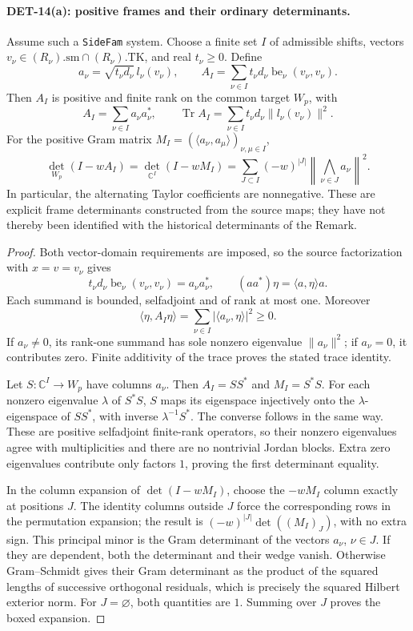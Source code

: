 \documentclass[11pt,a4paper]{article}
\newcommand{\Tr}{\operatorname{Tr}}
\begin{document}
\paragraph{DET-14(a): positive frames and their ordinary determinants.}
Assume such a \texttt{SideFam} system. Choose a finite set \(I\) of
admissible shifts, vectors
\(v_\nu\in(R_\nu).\mathrm{sm}\cap(R_\nu).\mathrm{TK}\), and
real \(t_\nu\ge0\). Define
\[
 a_\nu=\sqrt{t_\nu d_\nu}\,l_\nu(v_\nu),\qquad
 A_I=\sum_{\nu\in I}t_\nu d_\nu
                \operatorname{be}_\nu(v_\nu,v_\nu).
\]
Then \(A_I\) is positive and finite rank on the common target \(W_p\),
with
\[
 A_I=\sum_{\nu\in I}a_\nu a_\nu^*,\qquad
 \Tr A_I=\sum_{\nu\in I}t_\nu d_\nu\|l_\nu(v_\nu)\|^2.
\]
For the positive Gram matrix
\(M_I=(\langle a_\nu,a_\mu\rangle)_{\nu,\mu\in I}\),
\[
 \boxed{\quad
 \det_{W_p}(I-wA_I)=\det_{\mathbb C^I}(I-wM_I)
 =\sum_{J\subset I}(-w)^{|J|}
       \left\|\bigwedge_{\nu\in J}a_\nu\right\|^2.\quad}
\]
In particular, the alternating Taylor coefficients are nonnegative.
These are explicit frame determinants constructed from the source
maps; they have not thereby been identified with the historical
determinants of the Remark.
\begin{proof}
Both vector-domain requirements are imposed, so the source
factorization with \(x=v=v_\nu\) gives
\[
 t_\nu d_\nu\operatorname{be}_\nu(v_\nu,v_\nu)
 =a_\nu a_\nu^*,\qquad
 (aa^*)\eta=\langle a,\eta\rangle a.
\]
Each summand is bounded, selfadjoint and of rank at most one.
Moreover
\[
 \langle\eta,A_I\eta\rangle
 =\sum_{\nu\in I}|\langle a_\nu,\eta\rangle|^2\ge0.
\]
If \(a_\nu\ne0\), its rank-one summand has sole nonzero eigenvalue
\(\|a_\nu\|^2\); if \(a_\nu=0\), it contributes zero. Finite
additivity of the trace proves the stated trace identity.

Let \(S:\mathbb C^I\to W_p\) have columns \(a_\nu\).
Then \(A_I=SS^*\) and \(M_I=S^*S\).
For each nonzero eigenvalue \(\lambda\) of \(S^*S\), \(S\) maps its
eigenspace injectively onto the \(\lambda\)-eigenspace of \(SS^*\),
with inverse \(\lambda^{-1}S^*\). The converse follows in the
same way. These are positive selfadjoint finite-rank operators,
so their nonzero eigenvalues agree with multiplicities and there
are no nontrivial Jordan blocks. Extra zero eigenvalues contribute
only factors \(1\), proving the first determinant equality.

In the column expansion of \(\det(I-wM_I)\), choose the
\(-wM_I\) column exactly at positions \(J\).
The identity columns outside \(J\) force the corresponding rows
in the permutation expansion; the result is
\((-w)^{|J|}\det((M_I)_J)\), with no extra sign.
This principal minor is the Gram determinant of the vectors
\(a_\nu\), \(\nu\in J\). If they are dependent, both the determinant
and their wedge vanish. Otherwise Gram--Schmidt gives their
Gram determinant as the product of the squared lengths of successive
orthogonal residuals, which is precisely the squared Hilbert
exterior norm. For \(J=\varnothing\), both quantities are \(1\).
Summing over \(J\) proves the boxed expansion.
\end{proof}
\end{document}
